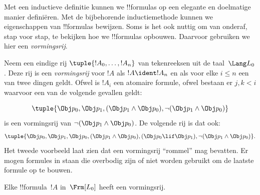 \documentclass[../../../include/open-logic-section]{subfiles}
\begin{document}


Met een inductieve definitie kunnen we !!{formula}s op een elegante en
doelmatige manier definiëren. Met de bijbehorende inductiemethode
kunnen we eigenschappen van !!{formula}s bewijzen. Soms is het ook
nuttig om van onderaf, stap voor stap, te bekijken hoe we !!{formula}s
opbouwen. Daarvoor gebruiken we hier een \emph{vormingsrij}.

\begin{defn}
Neem een eindige rij $\tuple{!A_0,\dotsc,!A_n}$ van tekenreeksen uit de
taal~$\Lang L_0$. Deze rij is een \emph{vormingsrij} voor $!A$ als
$!A \ident !A_n$ en als voor elke $i \leq n$ een van twee dingen
geldt. Ofwel is $!A_i$ een atomaire formule, ofwel bestaan er
$j,k < i$ waarvoor een van de volgende gevallen geldt:
\begin{enumerate}
\end{enumerate}
\end{defn}

\begin{ex}
\[
\tuple{
    \Obj p_0,
    \Obj p_1,
    (\Obj p_1 \land \Obj p_0),
    \lnot (\Obj p_1 \land \Obj p_0)
}
\]
is een vormingsrij van
$\lnot (\Obj p_1 \land \Obj p_0)$. De volgende rij is dat ook:
\[
\tuple{
    \Obj p_0,
    \Obj p_1,
    \Obj p_0,
    (\Obj p_1 \land \Obj p_0),
    (\Obj p_0 \lif \Obj p_1),
    \lnot (\Obj p_1 \land \Obj p_0)
}.
\]
%
Het tweede voorbeeld laat zien dat een vormingsrij ``rommel'' mag
bevatten. Er mogen formules in staan die overbodig zijn of niet worden
gebruikt om de laatste formule op te bouwen.
\end{ex}

\begin{prop}
Elke !!{formula}~$!A$ in~$\Frm[L_0]$ heeft een vormingsrij.
\end{prop}
\end{document}
